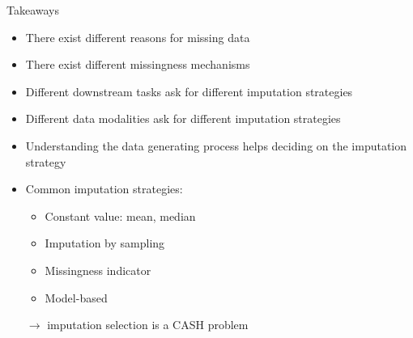 \documentclass[11pt,compress,t,notes=noshow, xcolor=table]{beamer}
\begin{document}
\begin{frame}{Takeaways}
    \vfill
    \begin{itemize}
        \item There exist different reasons for missing data
        \item There exist different missingness mechanisms
        \item Different downstream tasks ask for different imputation strategies
        \item Different data modalities ask for different imputation strategies
        \item Understanding the data generating process helps deciding on the imputation strategy
        \item Common imputation strategies:
        \begin{itemize}
            \item Constant value: mean, median
            \item Imputation by sampling
            \item Missingness indicator
            \item Model-based
        \end{itemize}
        $\rightarrow$ imputation selection is a CASH problem
    \end{itemize}
    \vfill
\end{frame}

\endlecture
\end{document}
